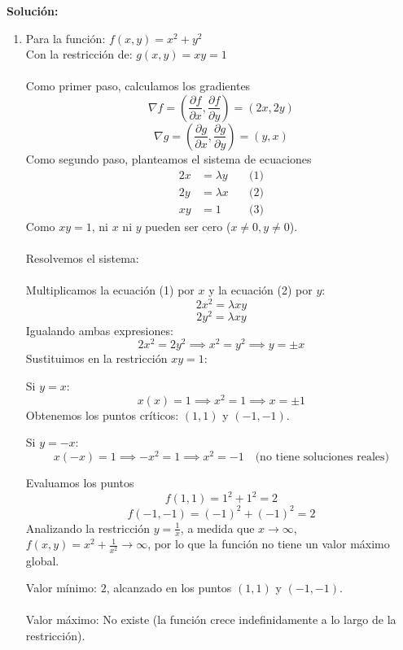\documentclass[12pt,a4paper]{report}
\newcommand{\solutionname}{Solución:}
\newenvironment{solution}{
 	\par\noindent\textbf{\color{structurecolor}\solutionname}
 	\color{black!90}}{\hfill\quad\par}
\begin{document}
\begin{solution}
\begin{enumerate}
	\item [a)] Para la función: $f(x, y) = x^2 + y^2$\\
Con la restricción de: $g(x, y) = xy = 1$\\
\\
Como primer paso, calculamos los gradientes
$$\nabla f = \left( \frac{\partial f}{\partial x}, \frac{\partial f}{\partial y} \right) = (2x, 2y)$$
$$\nabla g = \left( \frac{\partial g}{\partial x}, \frac{\partial g}{\partial y} \right) = (y, x)$$
 Como segundo paso, planteamos el sistema de ecuaciones
$$\begin{aligned}
2x &= \lambda y \quad &\text{(1)} \\
2y &= \lambda x \quad &\text{(2)} \\
xy &= 1 \quad &\text{(3)}
\end{aligned}$$
Como $xy = 1$, ni $x$ ni $y$ pueden ser cero ($x \neq 0, y \neq 0$).\\
\\
Resolvemos  el sistema:\\
\\
Multiplicamos la ecuación (1) por $x$ y la ecuación (2) por $y$:
$$2x^2 = \lambda xy$$
$$2y^2 = \lambda xy$$
Igualando ambas expresiones:
$$2x^2 = 2y^2 \implies x^2 = y^2 \implies y = \pm x$$
Sustituimos en la restricción $xy = 1$:


Si $y = x$:
$$x(x) = 1 \implies x^2 = 1 \implies x = \pm 1$$
Obtenemos los puntos críticos: $(1, 1)$ y $(-1, -1)$.


Si $y = -x$:
$$x(-x) = 1 \implies -x^2 = 1 \implies x^2 = -1 \quad \text{(no tiene soluciones reales)}$$


Evaluamos los puntos
$$f(1, 1) = 1^2 + 1^2 = 2$$
$$f(-1, -1) = (-1)^2 + (-1)^2 = 2$$
Analizando la restricción $y = \frac{1}{x}$, a medida que $x \to \infty$, $f(x, y) = x^2 + \frac{1}{x^2} \to \infty$, por lo que la función no tiene un valor máximo global.

Valor mínimo: $2$, alcanzado en los puntos $(1, 1)$ y $(-1, -1)$.\\
\\
Valor máximo: No existe (la función crece indefinidamente a lo largo de la restricción).\\



\end{enumerate}
\end{solution}
\end{document}
